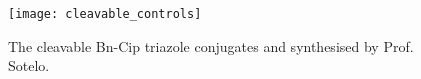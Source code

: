 \begin{figure}[H]
	\begin{center}
		\texttt{[image: cleavable\_controls]}
		\caption{
			The cleavable Bn-Cip triazole conjugates  and  synthesised by Prof. Sotelo.
			\label{fig:cleavable_controls}}
	\end{center}
\end{figure}


